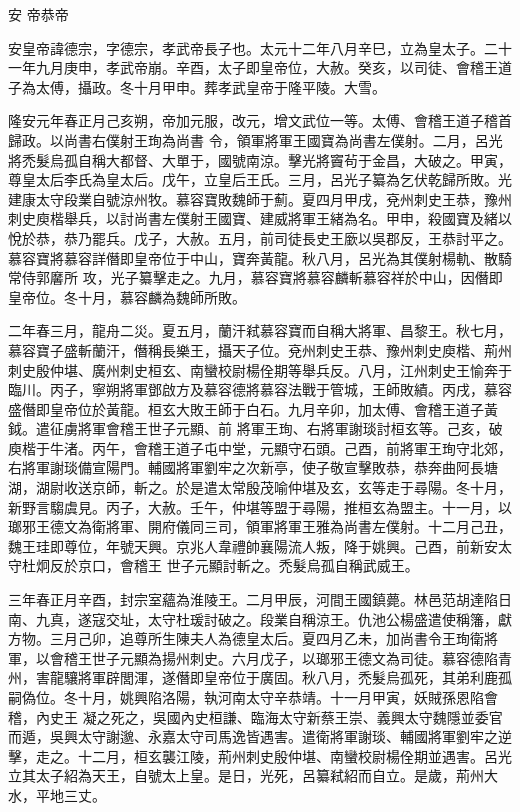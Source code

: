 
\begin{pinyinscope}

 安
 帝恭帝



 安皇帝諱德宗，字德宗，孝武帝長子也。太元十二年八月辛巳，立為皇太子。二十一年九月庚申，孝武帝崩。辛酉，太子即皇帝位，大赦。癸亥，以司徒、會稽王道子為太傅，攝政。冬十月甲申。葬孝武皇帝于隆平陵。大雪。



 隆安元年春正月己亥朔，帝加元服，改元，增文武位一等。太傅、會稽王道子稽首歸政。以尚書右僕射王珣為尚書
 令，領軍將軍王國寶為尚書左僕射。二月，呂光將禿髮烏孤自稱大都督、大單于，國號南涼。擊光將竇茍于金昌，大破之。甲寅，尊皇太后李氏為皇太后。戊午，立皇后王氏。三月，呂光子纂為乞伏乾歸所敗。光建康太守段業自號涼州牧。慕容寶敗魏師于薊。夏四月甲戌，兗州刺史王恭，豫州刺史庾楷舉兵，以討尚書左僕射王國寶、建威將軍王緒為名。甲申，殺國寶及緒以悅於恭，恭乃罷兵。戊子，大赦。五月，前司徒長史王廞以吳郡反，王恭討平之。慕容寶將慕容詳僭即皇帝位于中山，寶奔黃龍。秋八月，呂光為其僕射楊軌、散騎常侍郭黁所
 攻，光子纂擊走之。九月，慕容寶將慕容麟斬慕容祥於中山，因僭即皇帝位。冬十月，慕容麟為魏師所敗。



 二年春三月，龍舟二災。夏五月，蘭汗弒慕容寶而自稱大將軍、昌黎王。秋七月，慕容寶子盛斬蘭汗，僭稱長樂王，攝天子位。兗州刺史王恭、豫州刺史庾楷、荊州刺史殷仲堪、廣州刺史桓玄、南蠻校尉楊佺期等舉兵反。八月，江州刺史王愉奔于臨川。丙子，寧朔將軍鄧啟方及慕容德將慕容法戰于管城，王師敗績。丙戌，慕容盛僭即皇帝位於黃龍。桓玄大敗王師于白石。九月辛卯，加太傅、會稽王道子黃鉞。遣征虜將軍會稽王世子元顯、前
 將軍王珣、右將軍謝琰討桓玄等。己亥，破庾楷于牛渚。丙午，會稽王道子屯中堂，元顯守石頭。己酉，前將軍王珣守北郊，右將軍謝琰備宣陽門。輔國將軍劉牢之次新亭，使子敬宣擊敗恭，恭奔曲阿長塘湖，湖尉收送京師，斬之。於是遣太常殷茂喻仲堪及玄，玄等走于尋陽。冬十月，新野言騶虞見。丙子，大赦。壬午，仲堪等盟于尋陽，推桓玄為盟主。十一月，以瑯邪王德文為衛將軍、開府儀同三司，領軍將軍王雅為尚書左僕射。十二月己丑，魏王珪即尊位，年號天興。京兆人韋禮帥襄陽流人叛，降于姚興。己酉，前新安太守杜炯反於京口，會稽王
 世子元顯討斬之。禿髮烏孤自稱武威王。



 三年春正月辛酉，封宗室蘊為淮陵王。二月甲辰，河間王國鎮薨。林邑范胡達陷日南、九真，遂寇交址，太守杜瑗討破之。段業自稱涼王。仇池公楊盛遣使稱籓，獻方物。三月己卯，追尊所生陳夫人為德皇太后。夏四月乙未，加尚書令王珣衛將軍，以會稽王世子元顯為揚州刺史。六月戊子，以瑯邪王德文為司徒。慕容德陷青州，害龍驤將軍辟閭渾，遂僭即皇帝位于廣固。秋八月，禿髮烏孤死，其弟利鹿孤嗣偽位。冬十月，姚興陷洛陽，執河南太守辛恭靖。十一月甲寅，妖賊孫恩陷會稽，內史王
 凝之死之，吳國內史桓謙、臨海太守新蔡王崇、義興太守魏隱並委官而遁，吳興太守謝邈、永嘉太守司馬逸皆遇害。遣衛將軍謝琰、輔國將軍劉牢之逆擊，走之。十二月，桓玄襲江陵，荊州刺史殷仲堪、南蠻校尉楊佺期並遇害。呂光立其太子紹為天王，自號太上皇。是日，光死，呂纂弒紹而自立。是歲，荊州大水，平地三丈。




\end{pinyinscope}
